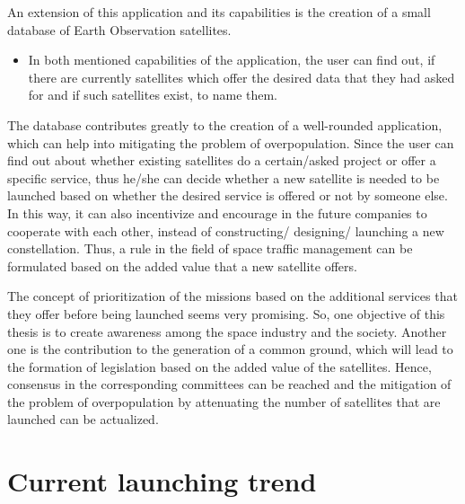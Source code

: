 An extension of this application and its capabilities is the creation of a small database of Earth Observation satellites.

\begin{itemize}
\item In both mentioned capabilities of the application, the user can find out, if there are currently satellites which offer the desired data that they had asked for and if such satellites exist, to name them.
\end{itemize}

The database contributes greatly to the creation of a well-rounded application, which can help into mitigating the problem of overpopulation. Since the user can find out about whether existing satellites do a certain/asked project or offer a specific service, thus he/she can decide whether a new satellite is needed to be launched based on whether the desired service is offered or not by someone else. In this way, it can also incentivize and encourage in the future companies to cooperate with each other, instead of constructing/ designing/ launching a new constellation. Thus, a rule in the field of space traffic management can be formulated based on the added value that a new satellite offers.

The concept of prioritization of the missions based on the additional services that they offer before being launched seems very promising. So, one objective of this thesis is to create awareness among the space industry and the society. Another one is the contribution to the generation of a common ground, which will lead to the formation of legislation based on the added value of the satellites. Hence, consensus in the corresponding committees can be reached and the mitigation of the problem of overpopulation by attenuating the number of satellites that are launched can be actualized.






\bigskip
\section{Current launching trend}
\bigskip

